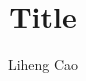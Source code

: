 \documentclass[12pt]{article}
\title{Title}
\author{Liheng Cao}
\begin{document}
\maketitle

\section{}
\end{document}
